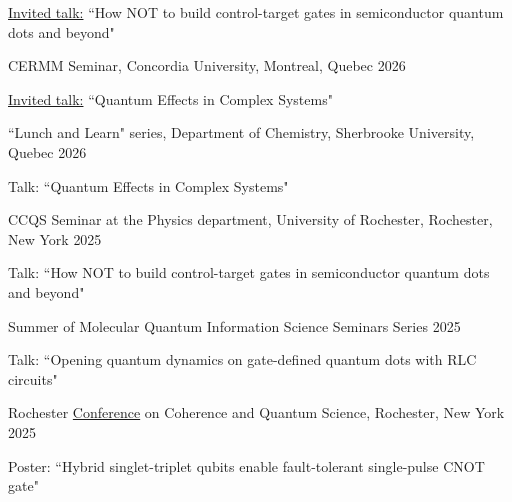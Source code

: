 \documentclass[margin,line]{res}
\newenvironment{list1}{
  \begin{list}{\ding{113}}{%
      \setlength{\itemsep}{0in}
      \setlength{\parsep}{0in} \setlength{\parskip}{0in}
      \setlength{\topsep}{0in} \setlength{\partopsep}{0in} 
      \setlength{\leftmargin}{0.17in}}}{\end{list}}
\begin{document}
\begin{resume}
\begin{list1}
\item[]\underline{Invited talk:} ``How NOT to build control-target gates in semiconductor quantum dots and beyond"
\end{list1}

\vspace*{-1mm}

CERMM Seminar, Concordia University, Montreal, Quebec \hfill{2026}

\begin{list1}
\item[]\underline{Invited talk:} ``Quantum Effects in Complex Systems"
\end{list1}

\vspace*{-1mm}

``Lunch and Learn" series, Department of Chemistry, Sherbrooke University, Quebec \hfill{2026}

\begin{list1}
\item[]Talk: ``Quantum Effects in Complex Systems"
\end{list1}

\vspace*{-1mm}

CCQS Seminar at the Physics department, University of Rochester, Rochester, New York \hfill{2025}

\begin{list1}
\item[]Talk: ``How NOT to build control-target gates in semiconductor quantum dots and beyond"
\end{list1}

\vspace*{-1mm}

Summer of Molecular Quantum Information Science Seminars Series \hfill{2025}

\begin{list1}
\item[]Talk: ``Opening quantum dynamics on gate-defined quantum dots with RLC circuits"
\end{list1}

\vspace*{-1mm}

Rochester \href{https://www.sas.rochester.edu/quantum/cqs/cqs-12.html}{Conference} on Coherence and Quantum Science, Rochester, New York \hfill{2025}

\begin{list1}
\item[]Poster: ``Hybrid singlet-triplet qubits enable fault-tolerant single-pulse CNOT gate"
\end{list1}


\end{resume}
\end{document}
